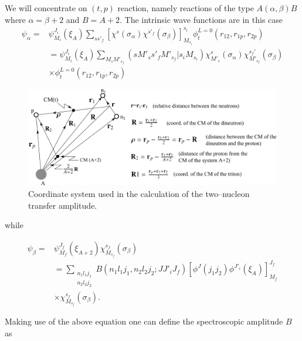 We will concentrate on $(t,p)$ reaction, namely reactions of the type $A(\alpha,\beta)B$ where $\alpha=\beta+2$ and $B=A+2$.
The intrinsic wave functions are in this case
\begin{equation}\label{5lec1}
\begin{split}
\psi_\alpha=& \psi_{M_i}^{J_i}(\xi_A) \sum_{s s'_f} \left[ \chi^s(\sigma_\alpha) \chi^{s'_f}(\sigma_\beta) \right] _{M_{s_i}}^{s_i}
\phi_t^{L=0}\left(r_{12},r_{1p},r_{2p}\right)\\
&= \psi_{M_i}^{J_i}(\xi_A) \sum_{M_s M'_{s_f}} (s M'_{s} s'_f M'_{s_f}| s_i M_{s_i}) \chi^s_{M'_s}(\sigma_\alpha) \chi^{s_f'}_{M'_{s_f}}(\sigma_\beta)\\
& \times \phi_t^{L=0}\left(r_{12},r_{1p},r_{2p}\right)
\end{split}
\end{equation}
 \begin{figure}[h!]
 	\begin{center}
\includegraphics*[width=\textwidth]{C7/figs_C7/coord}
\end{center}
\caption{Coordinate system used in the calculation of the two--nucleon transfer amplitude.}\label{fig_coord}
\end{figure}
while

\begin{equation}\label{5lec2}
\begin{split}
\psi_\beta=& \psi_{M_f}^{J_f}(\xi_{A+2}) \chi^{s_f}_{M_{s_f}}(\sigma_\beta)\\
&=\sum_{\substack{n_1 l_1 j_1\\n_2 l_2 j_2}} B(n_1 l_1 j_1,n_2 l_2 j_2;JJ'_iJ_f)
\left[ \phi^J(j_1 j_2) \phi^{J'_i}(\xi_A)\right]^{J_f}_{M_f}\\
&\times \chi^{s_f}_{M_{s_f}}(\sigma_\beta).
\end{split}
\end{equation}

Making use of the above equation one can define the spectroscopic amplitude $B$ as


